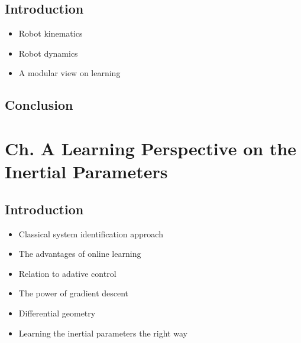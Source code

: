 \documentclass[12pt, a4paper]{article}
\begin{document}
\subsection*{Introduction}
\begin{itemize}
	\item Robot kinematics
	\item Robot dynamics
	\item A modular view on learning
	
	
\end{itemize}
\subsection*{Conclusion}


\section*{Ch. A Learning Perspective on the Inertial Parameters}

\subsection*{Introduction}
\begin{itemize}
	\item Classical system identification approach
	\item The advantages of online learning
	\item Relation to adative control
	\item The power of gradient descent
	\item Differential geometry
	\item Learning the inertial parameters the right way
	
\end{itemize}
\end{document}
